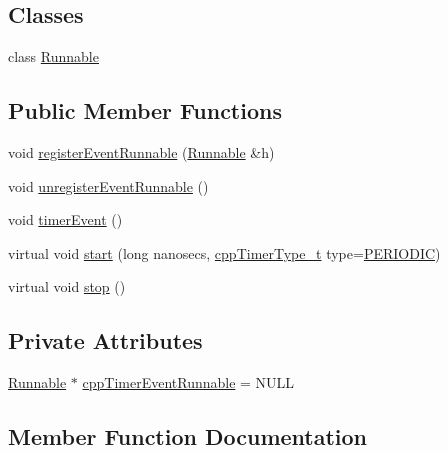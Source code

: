 \subsection*{Classes}
\begin{DoxyCompactItemize}
\item 
class \hyperlink{classCppTimerCallback_1_1Runnable}{Runnable}
\end{DoxyCompactItemize}
\subsection*{Public Member Functions}
\begin{DoxyCompactItemize}
\item 
void \hyperlink{classCppTimerCallback_ae6e815f1c3b65ea4f10fe0332e13acb9}{register\+Event\+Runnable} (\hyperlink{classCppTimerCallback_1_1Runnable}{Runnable} \&h)
\item 
void \hyperlink{classCppTimerCallback_a29d8d5a426a3d15bca8a42c2c897f50f}{unregister\+Event\+Runnable} ()
\item 
void \hyperlink{classCppTimerCallback_af6b39f5eb8e98bfc1b301ac3f25276e9}{timer\+Event} ()
\item 
virtual void \hyperlink{classCppTimer_a64989025caa3c030c6c397ca76a2d20b}{start} (long nanosecs, \hyperlink{CppTimer_8h_a110d07ab6a96d7815149d3d95435790a}{cpp\+Timer\+Type\+\_\+t} type=\hyperlink{CppTimer_8h_a110d07ab6a96d7815149d3d95435790aae4379d044711537d9ce3b3b58c575c58}{P\+E\+R\+I\+O\+D\+IC})
\item 
virtual void \hyperlink{classCppTimer_a4bb95ddee98a536d0818b8f6096bf7e7}{stop} ()
\end{DoxyCompactItemize}
\subsection*{Private Attributes}
\begin{DoxyCompactItemize}
\item 
\hyperlink{classCppTimerCallback_1_1Runnable}{Runnable} $\ast$ \hyperlink{classCppTimerCallback_a578cc701cee7be10f3afab2859eac74f}{cpp\+Timer\+Event\+Runnable} = N\+U\+LL
\end{DoxyCompactItemize}


\subsection{Member Function Documentation}
\mbox{\label{classCppTimerCallback_ae6e815f1c3b65ea4f10fe0332e13acb9}} 
